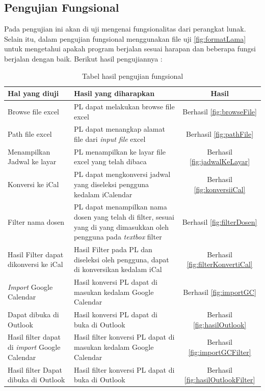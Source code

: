\subsection{Pengujian Fungsional}
Pada pengujian ini akan di uji mengenai fungsionalitas dari perangkat lunak. Selain itu, dalam pengujian fungsional menggunakan file uji \ref{fig:formatLama} untuk mengetahui apakah program berjalan sesuai harapan dan beberapa fungsi berjalan dengan baik. Berikut hasil pengujiannya : 
\begin{table}[H]
	\centering
		\caption{Tabel hasil pengujian fungsional}
		\label{tab:fungsional}
		\begin{tabular}{ | p{4cm} | p{4cm} | c | }
			\hline
				Hal yang diuji & Hasil yang diharapkan & Hasil \\ \hline
				Browse file excel & PL dapat melakukan browse file excel & Berhasil \ref{fig:browseFile}\\ \hline
				Path file excel & PL dapat menangkap alamat file dari \textit{input file} excel & Berhasil \ref{fig:pathFile} \\ \hline
				Menampilkan Jadwal ke layar & PL menampilkan ke layar file excel yang telah dibaca & Berhasil \ref{fig:jadwalKeLayar} \\ \hline
				Konversi ke iCal & PL dapat mengkonversi jadwal yang diseleksi pengguna kedalam iCalendar & Berhasil \ref{fig:konversiiCal} \\ \hline
				Filter nama dosen & PL dapat menampilkan nama dosen yang telah di filter, sesuai yang di yang dimasukkan oleh pengguna pada \textit{textbox} filter & Berhasil \ref{fig:filterDosen} \\ \hline
				Hasil Filter dapat dikonversi ke iCal & Hasil Filter pada PL dan diseleksi oleh pengguna, dapat di konversikan kedalam iCal & Berhasil \ref{fig:filterKonvertiCal} \\ \hline
				\textit{Import} Google Calendar & Hasil konversi PL dapat di masukan kedalam Google Calendar & Berhasil \ref{fig:importGC} \\ \hline
				Dapat dibuka di Outlook & Hasil konversi PL dapat di buka di Outlook & Berhasil  \ref{fig:hasilOutlook}\\ \hline
				Hasil filter dapat di \textit{import} Google Calendar & Hasil filter konversi PL dapat di masukan kedalam Google Calendar & Berhasil \ref{fig:importGCFilter} \\ \hline
				Hasil filter Dapat dibuka di Outlook & Hasil filter konversi PL dapat di buka di Outlook & Berhasil \ref{fig:hasilOutlookFilter} \\ \hline
		\end{tabular}
\end{table}

